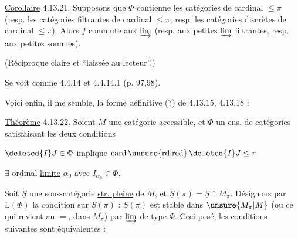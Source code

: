 \uline{Corollaire} 4.13.21.  Supposons que $\Phi$ contienne les catégories de cardinal $\leq\pi$ (resp. les catégories filtrantes de cardinal $\leq\pi$,  resp. les catégories discrètes de cardinal $\leq\pi$). Alors $f$ commute aux  $\varinjlim$  (resp. aux petites $\varinjlim$ filtrantes,  resp. aux petites sommes).

(Réciproque claire et ``laissée au lecteur''.)

Se voit comme 4.4.14 et 4.4.14.1 (p. 97,98).




Voici enfin, il me semble, la forme définitive (?) de 4.13.15, 4.13.18 :


\uline{Théorème} 4.13.22. Soient $M$ une catégorie accessible,  et $\Phi$ un ens. de catégories satisfaisant les deux conditions

 $\deleted{I}J\in\Phi$ implique $\mathrm{card}\,\unsure{\mathrm{rd}|\mathrm{red}}\,\deleted{I}J\leq\pi$

 $\exists$ ordinal \uline{limite} $\alpha_0$ avec $I_{\alpha_0}\in\Phi$.

 Soit $\underline S$ une sous-catégorie \uline{str. pleine} de $M$, et $\underline S(\pi)=\underline S\cap M_\pi$.  Désignons par $\mathrm L(\Phi)$ la condition sur $\underline S(\pi)$ : $\underline S(\pi)$ est stable dans $\unsure{M_\pi|M}$ (ou ce qui revient au $=$, dans $M_\pi$) par $\varinjlim$ de type $\Phi$. Ceci posé, les conditions suivantes  sont équivalentes :

